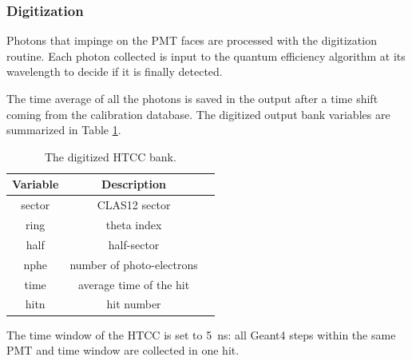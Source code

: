 \subsubsection{Digitization}

Photons that impinge on the PMT faces are processed with the digitization routine. Each photon collected is input to the
quantum efficiency algorithm at its wavelength to decide if it is finally detected.

The time average of all the photons is saved in the output after a time shift coming from the calibration database.
The digitized output bank variables are summarized in Table \ref{tab:htccBank}.

\begin{table}[h]
	\begin{center}
		\begin{tabular}{| c | c | c |}
			\hline \hline
			Variable  & Description                         \\
			\hline
             sector   &                   CLAS12 sector     \\
             ring     &                     theta index     \\
             half     &                     half-sector     \\
             nphe     &        number of photo-electrons     \\
             time     &         average time of the hit     \\
             hitn     &                      hit number     \\
			\hline \hline
		\end{tabular}
	\end{center}
	\caption{The digitized HTCC bank.}
        \label{tab:htccBank}
\end{table}

The time window  of the HTCC is set to 5~ns: all Geant4 steps within the same PMT and time window are collected in one hit.
